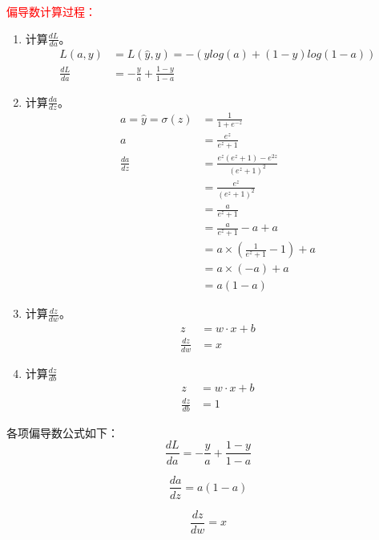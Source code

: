 \textcolor{red}{偏导数计算过程：}
\begin{enumerate}
	\item 计算$\frac{dL}{da}$。
		\begin{align*}
				L(a, y) &= 	L(\hat{y}, y) = -(ylog(a) + (1 - y)log(1 - a)) \\
				\frac{dL}{da} &=-\frac{y}{a} + \frac{1 - y}{1 - a}	
		\end{align*}
	
	\item 计算$\frac{da}{dz}$。
	\begin{align*}
		a = \hat{y} = \sigma (z) &= \frac{1}{1 + e^{-z}} \\
									a	&=\frac{e^z}{e^z + 1} \\
			 			\frac{da}{dz} &= \frac{e^z(e^z + 1) - e^{2z}}{(e^z + 1)^2} \\
			 								&= \frac{e^z}{(e^z + 1)^2}  \\
			 								&= \frac{a}{e^z + 1} \\
			 								&= \frac{a}{e^z + 1} - a + a\\
			 								&= a \times  (\frac{1}{e^z + 1} - 1) + a\\
			 								&= a \times (-a) + a \\
			 								&= a(1 	- a)
	\end{align*}

	\item 计算$\frac{dz}{dw}$。
	\begin{align*}
		z &= w \cdotp x + b \\
		\frac{dz}{dw} &= x
	\end{align*}
	
	
	\item 计算$\frac{dz}{db}$
	\begin{align*}
	z &= w \cdotp x + b \\
	\frac{dz}{db} &= 1
	\end{align*}
\end{enumerate}

各项偏导数公式如下：
\begin{equation}
	\frac{dL}{da} =-\frac{y}{a} + \frac{1 - y}{1 - a} \label{eq:derivative_loss}
\end{equation}

\begin{equation}
	\frac{da}{dz} =a(1 	- a) \label{eq:derivative_active}
\end{equation}

\begin{equation}
	\frac{dz}{dw} = x \label{eq:derivative_logistic_dw}
\end{equation}

